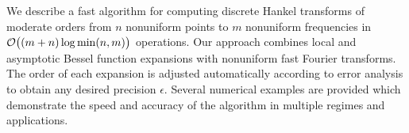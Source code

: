 We describe a fast algorithm for computing discrete Hankel transforms of
moderate orders from $n$ nonuniform points to $m$ nonuniform frequencies in
$\mathcal{O}\big((m+n)\log\min(n,m)\big)$ operations. Our approach combines local and
asymptotic Bessel function expansions with nonuniform fast Fourier transforms.
The order of each expansion is adjusted automatically according to error
analysis to obtain any desired precision $\epsilon$. Several numerical examples
are provided which demonstrate the speed and accuracy of the algorithm in
multiple regimes and applications.

